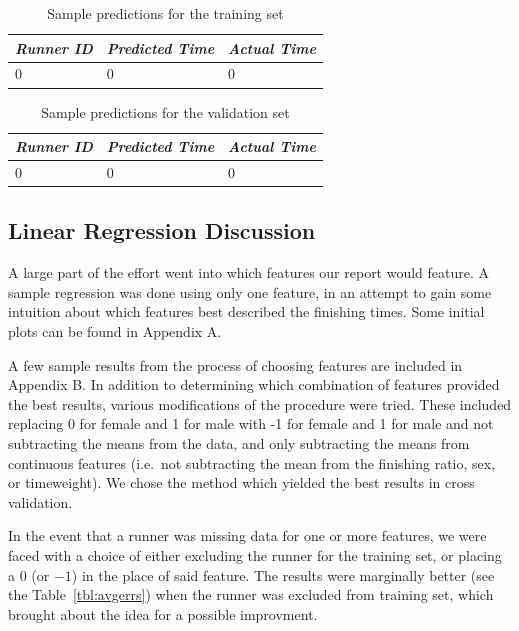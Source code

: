\documentclass{article}
\begin{document}
\begin{table}[ht!]
    \centering
    \begin{tabular}{| l | l | l |}
        \hline
        {\em Runner ID} & {\em Predicted Time} & {\em Actual Time}  \\ \hline
        0 & 0 & 0  \\ \hline
    \end{tabular}
    \caption{Sample predictions for the training set}
    \label{tbl:predtrain}
\end{table}

\begin{table}[ht!]
    \centering
    \begin{tabular}{| l | l | l |}
        \hline
        {\em Runner ID} & {\em Predicted Time} & {\em Actual Time}  \\ \hline
        0 & 0 & 0  \\ \hline
    \end{tabular}
    \caption{Sample predictions for the validation set}
    \label{tbl:predvalid}
\end{table}




\subsection*{Linear Regression Discussion}

A large part of the effort went into which features our report would feature. A sample regression was done using only
one feature, in an attempt to gain some intuition about which features best described the finishing times.
Some initial plots can be found in Appendix A.

A few sample results from the process of choosing features are included in Appendix B.
In addition to determining which combination of features provided the best results, various modifications of
the procedure were tried. These included replacing 0 for female and 1 for male with -1 for female and 1 for male and not
subtracting the means from the data, and only subtracting the means from continuous features (i.e.\ not subtracting 
the mean from the finishing ratio, sex, or timeweight). 
We chose the method which yielded the best results in cross validation. 

In the event that a runner was missing data for one or more features, we were faced with a choice of either excluding the
runner for the training set, or placing a $0$ (or $-1$) in the place of said feature. The results were marginally better (see the Table~\ref{tbl:avgerrs}) when 
the runner was excluded from training set, which brought about the idea for a possible improvment.
\end{document}
